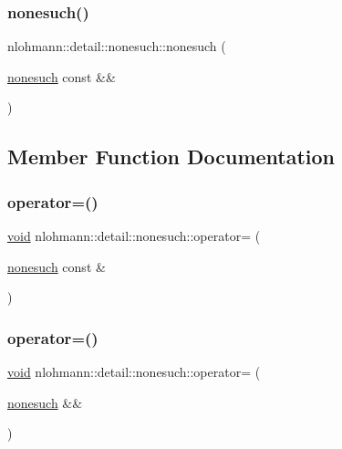\subsubsection{\texorpdfstring{nonesuch()}{nonesuch()}\hspace{0.1cm}{\footnotesize\ttfamily [3/3]}}
{\footnotesize\ttfamily nlohmann\+::detail\+::nonesuch\+::nonesuch (\begin{DoxyParamCaption}\item[{\mbox{\hyperlink{structnlohmann_1_1detail_1_1nonesuch}{nonesuch}} const \&\&}]{ }\end{DoxyParamCaption})\hspace{0.3cm}{\ttfamily [delete]}}



\subsection{Member Function Documentation}
\mbox{\label{structnlohmann_1_1detail_1_1nonesuch_add6ef84c52a851e391cef514c85f2ffe}} 
\subsubsection{\texorpdfstring{operator=()}{operator=()}\hspace{0.1cm}{\footnotesize\ttfamily [1/2]}}
{\footnotesize\ttfamily \mbox{\hyperlink{namespacenlohmann_1_1detail_a59fca69799f6b9e366710cb9043aa77d}{void}} nlohmann\+::detail\+::nonesuch\+::operator= (\begin{DoxyParamCaption}\item[{\mbox{\hyperlink{structnlohmann_1_1detail_1_1nonesuch}{nonesuch}} const \&}]{ }\end{DoxyParamCaption})\hspace{0.3cm}{\ttfamily [delete]}}

\mbox{\label{structnlohmann_1_1detail_1_1nonesuch_a78ca022a1b4defe4f7ba662843602231}} 
\subsubsection{\texorpdfstring{operator=()}{operator=()}\hspace{0.1cm}{\footnotesize\ttfamily [2/2]}}
{\footnotesize\ttfamily \mbox{\hyperlink{namespacenlohmann_1_1detail_a59fca69799f6b9e366710cb9043aa77d}{void}} nlohmann\+::detail\+::nonesuch\+::operator= (\begin{DoxyParamCaption}\item[{\mbox{\hyperlink{structnlohmann_1_1detail_1_1nonesuch}{nonesuch}} \&\&}]{ }\end{DoxyParamCaption})\hspace{0.3cm}{\ttfamily [delete]}}



